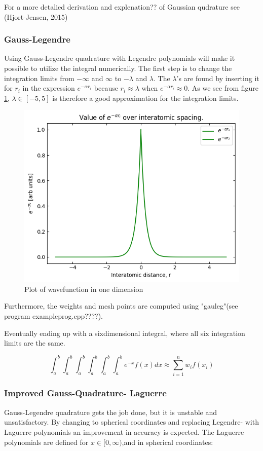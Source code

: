 \documentclass[../main.tex]{subfiles}
\begin{document}
For a more detalied derivation and explenation?? of Gaussian qudrature see (Hjort-Jensen, 2015)


\subsubsection{Gauss-Legendre}\label{sec:GLQ}
Using Gauss-Legendre quadrature with Legendre polynomials will make it possible to utilize the integral numerically. The first step is to change the integration limits from  $-\infty$ and $\infty$ to $-\lambda$ and $\lambda$. The $\lambda$'s are found by inserting it for $r_i$ in the expression $e^{-\alpha r_i}$ because $r_i \approx \lambda$ when $e^{-\alpha r_i} \approx 0$. As we see from figure \ref{fig:expfunc}, $\lambda \in [-5,5]$ is therefore a good approximation for the integration limits.

\begin{figure}
  \includegraphics[width=\textwidth]{../img/expfunc_plot.png}
  \caption{Plot of wavefunction in one dimension}
  \label{fig:expfunc}
\end{figure}

Furthermore, the  weights and mesh points are computed using "gauleg"(see program exampleprog.cpp????).

Eventually ending up with a sixdimensional integral, where all six integration limits are the same.

\[\int_a^b\int_a^b\int_a^b\int_a^b\int_a^b\int_a^b e^{-x}f(x)dx \approx \sum_{i=1}^n w_i f(x_i)\]

\subsubsection{Improved Gauss-Quadrature- Laguerre} \label{sec:improved_GQ}
Gauss-Legendre quadrature gets the job done, but it is unstable and unsatisfactory. By changing to spherical coordinates and  replacing Legendre- with Laguerre polynomials an improvement in accuracy is expected. The Laguerre polynomials are defined for  $x \in [0, \infty)$,and in spherical coordinates:
\\
\end{document}
